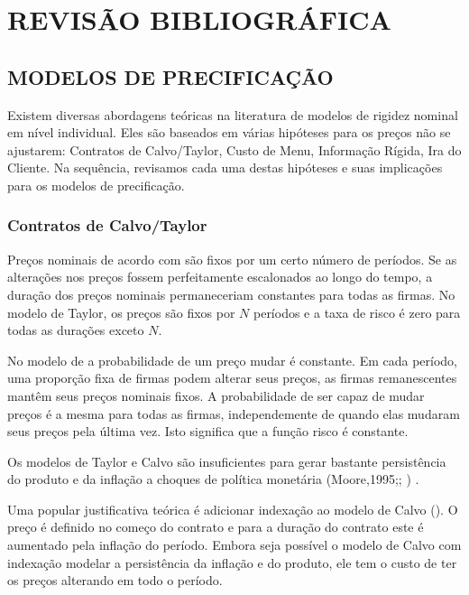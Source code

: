 \documentclass[twoside,a4paper,11pt]{report}
\begin{document}
\pagestyle{empty}
\cleardoublepage
\pagestyle{fancy}

\chapter{REVISÃO BIBLIOGRÁFICA}\label{cap2}

\section*{MODELOS DE PRECIFICAÇÃO}

Existem diversas abordagens teóricas na literatura de modelos de rigidez nominal em nível individual. Eles são baseados em várias hipóteses para os preços não se ajustarem: Contratos de Calvo/Taylor, Custo de Menu, Informação Rígida, Ira do Cliente. Na sequência, revisamos cada uma destas hipóteses e suas implicações para os modelos de precificação.

\subsection*{Contratos de Calvo/Taylor}

Preços nominais de acordo com \citet{taylor1980aggregate} são fixos por um certo número de períodos. Se as alterações nos preços fossem perfeitamente escalonados ao longo do tempo, a duração dos preços nominais permaneceriam constantes para todas as firmas. No modelo de Taylor, os preços são fixos por $N$ períodos e a taxa de risco é zero para todas as durações exceto $N$. 

No modelo de \citet{calvo1983staggered} a probabilidade de um preço mudar é constante. Em cada período, uma proporção fixa de firmas podem alterar seus preços, as firmas remanescentes mantêm seus preços nominais fixos. A probabilidade de ser capaz de mudar preços é a mesma para todas as firmas, independemente de quando elas mudaram seus preços pela última vez. Isto significa que a função risco é constante. 

Os modelos de Taylor e Calvo são insuficientes para gerar bastante persistência do produto e da inflação a choques de política monetária (Moore,1995;\citet{chari2000sticky}; \citet{christiano2005nominal}) . 

Uma popular justificativa teórica é adicionar indexação ao modelo de Calvo (\citet{smets2003estimated,woodford2005interest,christiano2005nominal}). O preço é definido no começo do contrato e para a duração do contrato este é aumentado pela inflação do período. Embora seja possível o modelo de Calvo com indexação modelar a persistência da inflação e do produto, ele tem o custo de ter os preços alterando em todo o período. 
\end{document}
